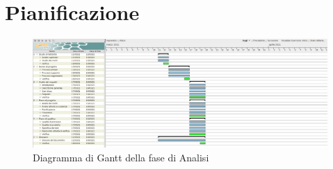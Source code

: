 \section{Pianificazione}
\begin{figure}[htbp]
    \includegraphics[scale=0.2]{../../../Images/Diagrammi/Gantt/Diagramma_gantt_analisi.png}
    \caption{Diagramma di Gantt della fase di Analisi}
\end{figure}